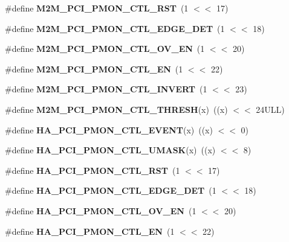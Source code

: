 \begin{DoxyCompactItemize}
\item 
\mbox{\label{types_8h_afede7f5b5948f59448c9ecb540612430}} 
\#define {\bfseries M2\+M\+\_\+\+P\+C\+I\+\_\+\+P\+M\+O\+N\+\_\+\+C\+T\+L\+\_\+\+R\+ST}~(1 $<$$<$ 17)
\item 
\mbox{\label{types_8h_a23acf5bc8ff693eb242fcb91730405f6}} 
\#define {\bfseries M2\+M\+\_\+\+P\+C\+I\+\_\+\+P\+M\+O\+N\+\_\+\+C\+T\+L\+\_\+\+E\+D\+G\+E\+\_\+\+D\+ET}~(1 $<$$<$ 18)
\item 
\mbox{\label{types_8h_a68a4501a2c2f12eb38ded3b8443013f6}} 
\#define {\bfseries M2\+M\+\_\+\+P\+C\+I\+\_\+\+P\+M\+O\+N\+\_\+\+C\+T\+L\+\_\+\+O\+V\+\_\+\+EN}~(1 $<$$<$ 20)
\item 
\mbox{\label{types_8h_a2b9915b49f5019284b07344a9a7ce9d9}} 
\#define {\bfseries M2\+M\+\_\+\+P\+C\+I\+\_\+\+P\+M\+O\+N\+\_\+\+C\+T\+L\+\_\+\+EN}~(1 $<$$<$ 22)
\item 
\mbox{\label{types_8h_a58f5aad3ba75282422c386099579a56a}} 
\#define {\bfseries M2\+M\+\_\+\+P\+C\+I\+\_\+\+P\+M\+O\+N\+\_\+\+C\+T\+L\+\_\+\+I\+N\+V\+E\+RT}~(1 $<$$<$ 23)
\item 
\mbox{\label{types_8h_a318610c09b16b8811efcfd1a8ae93ec4}} 
\#define {\bfseries M2\+M\+\_\+\+P\+C\+I\+\_\+\+P\+M\+O\+N\+\_\+\+C\+T\+L\+\_\+\+T\+H\+R\+E\+SH}(x)~((x) $<$$<$ 24\+U\+L\+L)
\item 
\mbox{\label{types_8h_a37048c778b6df5113d6b9872f9391643}} 
\#define {\bfseries H\+A\+\_\+\+P\+C\+I\+\_\+\+P\+M\+O\+N\+\_\+\+C\+T\+L\+\_\+\+E\+V\+E\+NT}(x)~((x) $<$$<$ 0)
\item 
\mbox{\label{types_8h_a6015b41c32c470ee6c56acada89e0ae0}} 
\#define {\bfseries H\+A\+\_\+\+P\+C\+I\+\_\+\+P\+M\+O\+N\+\_\+\+C\+T\+L\+\_\+\+U\+M\+A\+SK}(x)~((x) $<$$<$ 8)
\item 
\mbox{\label{types_8h_a15a0bc4bb361c0474a223ed06986e8eb}} 
\#define {\bfseries H\+A\+\_\+\+P\+C\+I\+\_\+\+P\+M\+O\+N\+\_\+\+C\+T\+L\+\_\+\+R\+ST}~(1 $<$$<$ 17)
\item 
\mbox{\label{types_8h_a323e34da72e1e67452ff879c315c568c}} 
\#define {\bfseries H\+A\+\_\+\+P\+C\+I\+\_\+\+P\+M\+O\+N\+\_\+\+C\+T\+L\+\_\+\+E\+D\+G\+E\+\_\+\+D\+ET}~(1 $<$$<$ 18)
\item 
\mbox{\label{types_8h_aaa155d82b40bca24985a100dd0a1590b}} 
\#define {\bfseries H\+A\+\_\+\+P\+C\+I\+\_\+\+P\+M\+O\+N\+\_\+\+C\+T\+L\+\_\+\+O\+V\+\_\+\+EN}~(1 $<$$<$ 20)
\item 
\mbox{\label{types_8h_a69de5ee5c4732be30a746c31b0cbb7e4}} 
\#define {\bfseries H\+A\+\_\+\+P\+C\+I\+\_\+\+P\+M\+O\+N\+\_\+\+C\+T\+L\+\_\+\+EN}~(1 $<$$<$ 22)
\item 

\end{DoxyCompactItemize}
